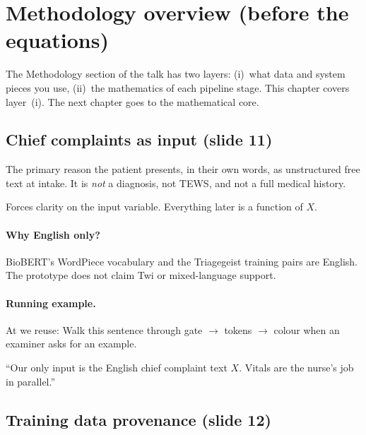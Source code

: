 \section{Methodology overview (before the equations)}
\label{sec:method-overview}

The Methodology section of the talk has two layers: (i)~what data and system pieces you use,
(ii)~the mathematics of each pipeline stage. This chapter covers layer~(i). The next chapter
goes to the mathematical core.

\subsection{Chief complaints as input (slide 11)}

\begin{definition}
The primary reason the patient presents, in their own words, as unstructured free text at intake.
It is \emph{not} a diagnosis, not TEWS, and not a full medical history.
\end{definition}

\begin{whybox}
Forces clarity on the input variable. Everything later is a function of \(X\).
\end{whybox}

\paragraph{Why English only?}
BioBERT's WordPiece vocabulary and the Triagegeist training pairs are English.
The prototype does not claim Twi or mixed-language support.

\paragraph{Running example.}
At \examplehospital{} we reuse: \runningcomplaint{}
Walk this sentence through gate \(\to\) tokens \(\to\) colour when an examiner asks for an example.

\begin{saybox}
``Our only input is the English chief complaint text \(X\). Vitals are the nurse's job in parallel.''
\end{saybox}

\subsection{Training data provenance (slide 12)}

